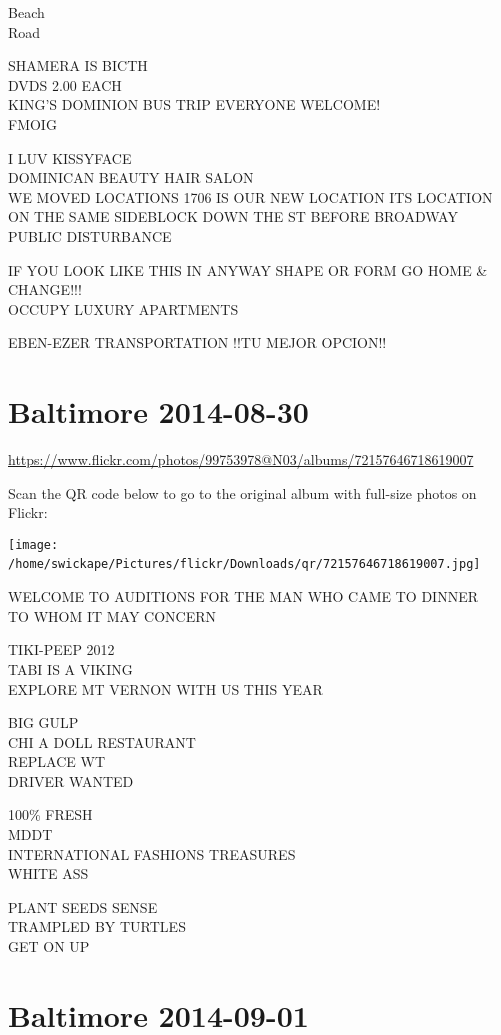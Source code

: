\documentclass[10pt,letterpaper]{article}
\begin{document}
Beach\\
Road

SHAMERA IS BICTH\\
DVDS 2.00 EACH\\
KING'S DOMINION BUS TRIP EVERYONE WELCOME!\\
FMOIG

I LUV KISSYFACE\\
DOMINICAN BEAUTY HAIR SALON\\
WE MOVED LOCATIONS 1706 IS OUR NEW LOCATION ITS LOCATION ON THE SAME SIDEBLOCK DOWN THE ST BEFORE BROADWAY\\
PUBLIC DISTURBANCE

IF YOU LOOK LIKE THIS IN ANYWAY SHAPE OR FORM GO HOME \& CHANGE!!!\\
OCCUPY LUXURY APARTMENTS

EBEN{-}EZER TRANSPORTATION  !!TU MEJOR OPCION!!
\

\section*{Baltimore 2014-08-30}

\url{https://www.flickr.com/photos/99753978@N03/albums/72157646718619007}

Scan the QR code below to go to the original album with full-size photos on Flickr:

\texttt{[image: /home/swickape/Pictures/flickr/Downloads/qr/72157646718619007.jpg]}
\

WELCOME TO AUDITIONS FOR THE MAN WHO CAME TO DINNER\\
TO WHOM IT MAY CONCERN

TIKI{-}PEEP 2012\\
TABI IS A VIKING\\
EXPLORE MT VERNON WITH US THIS YEAR

BIG GULP\\
CHI A DOLL RESTAURANT\\
REPLACE WT\\
DRIVER WANTED

100\% FRESH\\
MDDT\\
INTERNATIONAL FASHIONS TREASURES\\
WHITE ASS

PLANT SEEDS SENSE\\
TRAMPLED BY TURTLES\\
GET ON UP
\

\section*{Baltimore 2014-09-01}
\end{document}
